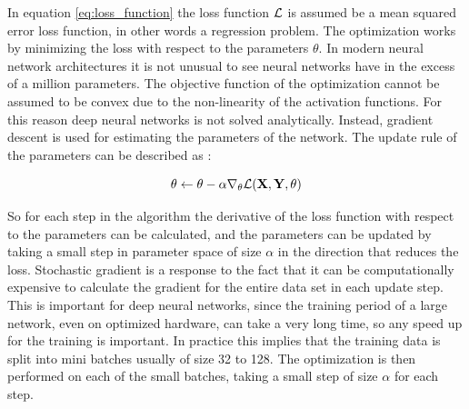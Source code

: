In equation \eqref{eq:loss_function} the loss function $\mathcal{L}$ is assumed be a mean squared error loss function, in other words a regression problem. The optimization works by minimizing the loss with respect to the parameters $\theta$. In modern neural network architectures it is not unusual to see neural networks have in the excess of a million parameters. The objective function of the optimization cannot be assumed to be convex due to the non-linearity of the activation functions. For this reason deep neural networks is not solved analytically. Instead, gradient descent is used for estimating the parameters of the network. The update rule of the parameters can be described as \parencite{goodfellow_deep_2016}:

\begin{equation}
    \theta \leftarrow \theta - \alpha \nabla_{\theta} \mathcal{L}(\textbf{X}, \textbf{Y}, \theta)
\end{equation}

So for each step in the algorithm the derivative of the loss function with respect to the parameters can be calculated, and the parameters can be updated by taking a small step in parameter space of size $\alpha$ in the direction that reduces the loss. Stochastic gradient is a response to the fact that it can be computationally expensive to calculate the gradient for the entire data set in each update step. This is important for deep neural networks, since the training period of a large network, even on optimized hardware, can take a very long time, so any speed up for the training is important. In practice this implies that the training data is split into mini batches usually of size 32 to 128. The optimization is then performed on each of the small batches, taking a small step of size $\alpha$ for each step.


